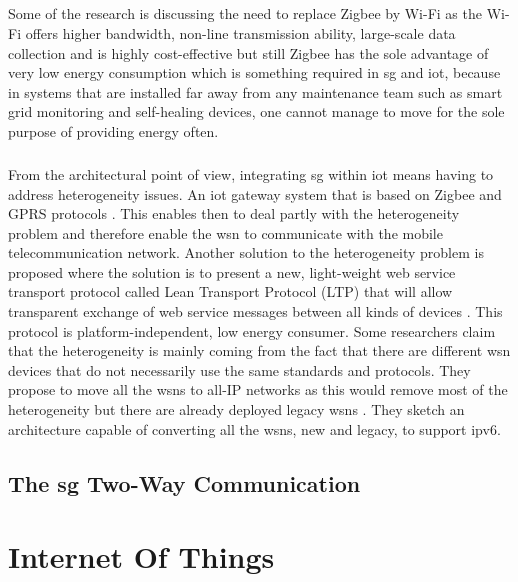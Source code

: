 \documentclass[oneside,12pt,a4paper,final]{book}
\begin{document}
\paragraph{}
Some of the research is discussing the need to replace Zigbee by Wi-Fi as the Wi-Fi offers higher bandwidth, non-line transmission ability, large-scale data collection and is highly cost-effective \cite{ref10} but still Zigbee has the sole advantage of very low energy consumption which is something required in \gls{sg} and \gls{iot}, because in systems that are installed far away from any maintenance team such as smart grid monitoring and self-healing devices, one cannot manage to move for the sole purpose of providing energy often. 
\paragraph{}
From the architectural point of view, integrating \gls{sg} within \gls{iot} means having to address heterogeneity issues. An \gls{iot} gateway system that is based on Zigbee and GPRS protocols \cite{ref11}. This enables then to deal partly with the heterogeneity problem and therefore enable the \gls{wsn} to communicate with the mobile telecommunication network. Another solution to the heterogeneity problem is proposed where the solution is to present a new, light-weight web service transport protocol called Lean Transport Protocol (LTP) that will allow transparent exchange of web service messages between all kinds of devices \cite{ref12}. This protocol is platform-independent, low energy consumer. Some researchers claim that the heterogeneity is mainly coming from the fact that there are different \gls{wsn} devices that do not necessarily use the same standards and protocols. They propose to move all the \glspl{wsn} to all-IP networks as this would remove most of the heterogeneity but there are already deployed legacy \glspl{wsn} \cite{ref13}. They sketch an architecture capable of converting all the \glspl{wsn}, new and legacy, to support \gls{ipv6}.
\section{The \gls{sg} Two-Way Communication}
\paragraph{}

\chapter{Internet Of Things}
\end{document}
